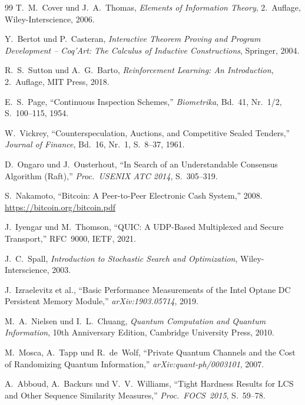 ﻿\documentclass[a4paper,12pt]{article}
\theoremstyle{definition}
\begin{document}
\begin{thebibliography}{99}
  T.~M.~Cover und J.~A.~Thomas,
  \textit{Elements of Information Theory}, 2.~Auflage,
  Wiley-Interscience, 2006.

  Y.~Bertot und P.~Casteran,
  \textit{Interactive Theorem Proving and Program Development --
  Coq'Art: The Calculus of Inductive Constructions},
  Springer, 2004.

  R.~S.~Sutton und A.~G.~Barto,
  \textit{Reinforcement Learning: An Introduction}, 2.~Auflage,
  MIT Press, 2018.

  E.~S.~Page,
  ``Continuous Inspection Schemes,''
  \textit{Biometrika}, Bd.~41, Nr.~1/2, S.~100--115, 1954.

  W.~Vickrey,
  ``Counterspeculation, Auctions, and Competitive Sealed Tenders,''
  \textit{Journal of Finance}, Bd.~16, Nr.~1, S.~8--37, 1961.

  D.~Ongaro und J.~Ousterhout,
  ``In Search of an Understandable Consensus Algorithm (Raft),''
  \textit{Proc.\ USENIX ATC 2014}, S.~305--319.

  S.~Nakamoto,
  ``Bitcoin: A Peer-to-Peer Electronic Cash System,''
  2008.
  \url{https://bitcoin.org/bitcoin.pdf}

  J.~Iyengar und M.~Thomson,
  ``QUIC: A UDP-Based Multiplexed and Secure Transport,''
  RFC~9000, IETF, 2021. \raggedright

  J.~C.~Spall,
  \textit{Introduction to Stochastic Search and Optimization},
  Wiley-Interscience, 2003.

  J.~Izraelevitz et al.,
  ``Basic Performance Measurements of the Intel Optane DC
  Persistent Memory Module,''
  \textit{arXiv:1903.05714}, 2019.

  M.~A.~Nielsen und I.~L.~Chuang,
  \textit{Quantum Computation and Quantum Information},
  10th Anniversary Edition, Cambridge University Press, 2010.

  M.~Mosca, A.~Tapp und R.~de~Wolf,
  ``Private Quantum Channels and the Cost of Randomizing
  Quantum Information,''
  \textit{arXiv:quant-ph/0003101}, 2007.

  A.~Abboud, A.~Backurs und V.~V.~Williams,
  ``Tight Hardness Results for LCS and Other Sequence Similarity
  Measures,''
  \textit{Proc.\ FOCS~2015}, S.~59--78.

\end{thebibliography}
\end{document}
